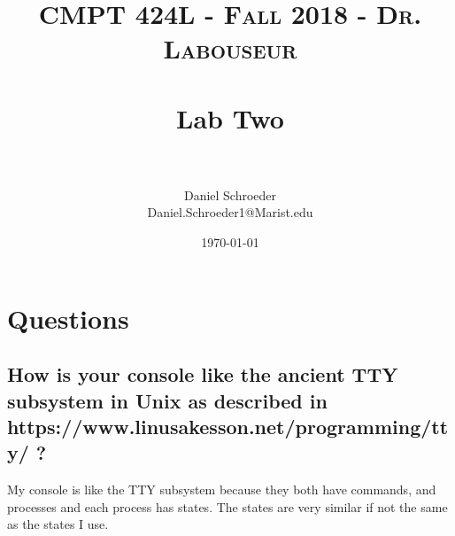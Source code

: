 \documentclass[letterpaper, 10pt,DIV=13]{scrartcl}
\title{	
   \normalfont \normalsize 
   \textsc{CMPT 424L - Fall 2018 - Dr. Labouseur} \\[10pt] %
   \horrule{0.5pt} \\[0.25cm] 	%
   \huge Lab Two  \\     	    %
   \horrule{0.5pt} \\[0.25cm] 	%
}
\author{Daniel Schroeder \\ \normalsize Daniel.Schroeder1@Marist.edu}
\date{\normalsize\today} 	%
\numberwithin{equation}{section} %
\numberwithin{figure}{section} %
\numberwithin{table}{section} %
\begin{document}
\maketitle %

\section{Questions}

\subsection{How is your console like the ancient TTY subsystem in Unix as described in https://www.linusakesson.net/programming/tty/ ? }
My console is like the TTY subsystem because they both have commands, and processes and each process has states. The states are very similar if not the same as the states I use.   
\end{document}
